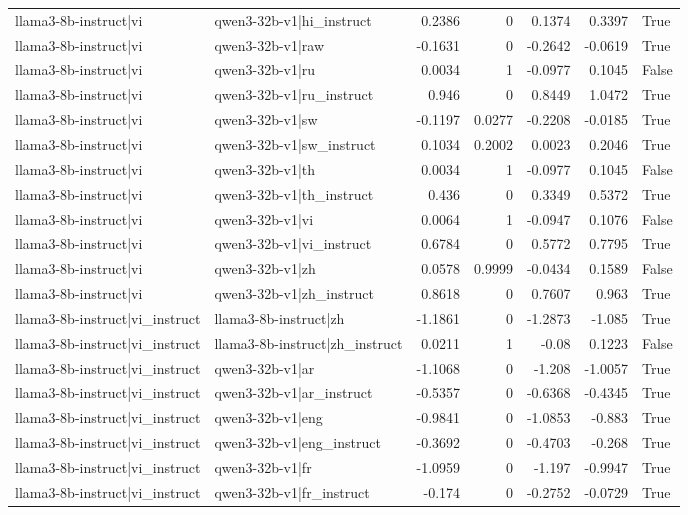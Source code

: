 \begin{table}
\begin{tabular}{l l r r r r l}
llama3-8b-instruct|vi & qwen3-32b-v1|hi_instruct & 0.2386 & 0 & 0.1374 & 0.3397 & True \\
llama3-8b-instruct|vi & qwen3-32b-v1|raw & -0.1631 & 0 & -0.2642 & -0.0619 & True \\
llama3-8b-instruct|vi & qwen3-32b-v1|ru & 0.0034 & 1 & -0.0977 & 0.1045 & False \\
llama3-8b-instruct|vi & qwen3-32b-v1|ru_instruct & 0.946 & 0 & 0.8449 & 1.0472 & True \\
llama3-8b-instruct|vi & qwen3-32b-v1|sw & -0.1197 & 0.0277 & -0.2208 & -0.0185 & True \\
llama3-8b-instruct|vi & qwen3-32b-v1|sw_instruct & 0.1034 & 0.2002 & 0.0023 & 0.2046 & True \\
llama3-8b-instruct|vi & qwen3-32b-v1|th & 0.0034 & 1 & -0.0977 & 0.1045 & False \\
llama3-8b-instruct|vi & qwen3-32b-v1|th_instruct & 0.436 & 0 & 0.3349 & 0.5372 & True \\
llama3-8b-instruct|vi & qwen3-32b-v1|vi & 0.0064 & 1 & -0.0947 & 0.1076 & False \\
llama3-8b-instruct|vi & qwen3-32b-v1|vi_instruct & 0.6784 & 0 & 0.5772 & 0.7795 & True \\
llama3-8b-instruct|vi & qwen3-32b-v1|zh & 0.0578 & 0.9999 & -0.0434 & 0.1589 & False \\
llama3-8b-instruct|vi & qwen3-32b-v1|zh_instruct & 0.8618 & 0 & 0.7607 & 0.963 & True \\
llama3-8b-instruct|vi_instruct & llama3-8b-instruct|zh & -1.1861 & 0 & -1.2873 & -1.085 & True \\
llama3-8b-instruct|vi_instruct & llama3-8b-instruct|zh_instruct & 0.0211 & 1 & -0.08 & 0.1223 & False \\
llama3-8b-instruct|vi_instruct & qwen3-32b-v1|ar & -1.1068 & 0 & -1.208 & -1.0057 & True \\
llama3-8b-instruct|vi_instruct & qwen3-32b-v1|ar_instruct & -0.5357 & 0 & -0.6368 & -0.4345 & True \\
llama3-8b-instruct|vi_instruct & qwen3-32b-v1|eng & -0.9841 & 0 & -1.0853 & -0.883 & True \\
llama3-8b-instruct|vi_instruct & qwen3-32b-v1|eng_instruct & -0.3692 & 0 & -0.4703 & -0.268 & True \\
llama3-8b-instruct|vi_instruct & qwen3-32b-v1|fr & -1.0959 & 0 & -1.197 & -0.9947 & True \\
llama3-8b-instruct|vi_instruct & qwen3-32b-v1|fr_instruct & -0.174 & 0 & -0.2752 & -0.0729 & True \\

\end{tabular}
\end{table}
